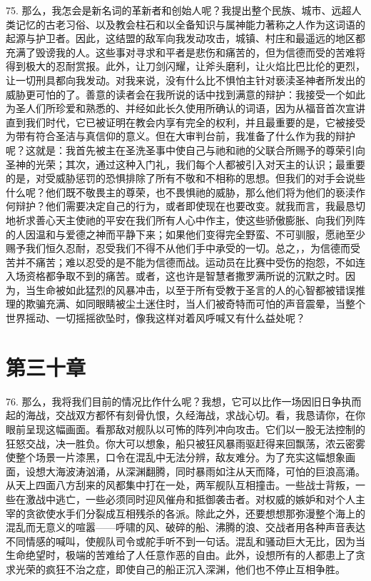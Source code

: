 75. 那么，我怎会是新名词的革新者和创始人呢？我提出整个民族、城市、远超人类记忆的古老习俗、以及教会柱石和以全备知识与属神能力著称之人作为这词语的起源与护卫者。因此，这结盟的敌军向我发动攻击，城镇、村庄和最遥远的地区都充满了毁谤我的人。这些事对寻求和平者是悲伤和痛苦的，但为信德而受的苦难将得到极大的忍耐赏报。此外，让刀剑闪耀，让斧头磨利，让火焰比巴比伦的更烈，让一切刑具都向我发动。对我来说，没有什么比不惧怕主针对亵渎圣神者所发出的威胁更可怕的了。善意的读者会在我所说的话中找到满意的辩护：我接受一个如此为圣人们所珍爱和熟悉的、并经如此长久使用所确认的词语，因为从福音首次宣讲直到我们时代，它已被证明在教会内享有完全的权利，并且最重要的是，它被接受为带有符合圣洁与真信仰的意义。但在大审判台前，我准备了什么作为我的辩护呢？这就是：我首先被主在圣洗圣事中使自己与祂和祂的父联合所赐予的尊荣引向圣神的光荣；其次，通过这种入门礼，我们每个人都被引入对天主的认识；最重要的是，对受威胁惩罚的恐惧排除了所有不敬和不相称的思想。但我们的对手会说些什么呢？他们既不敬畏主的尊荣，也不畏惧祂的威胁，那么他们将为他们的亵渎作何辩护？他们需要决定自己的行为，或者即使现在也要改变。就我而言，我最恳切地祈求善心天主使祂的平安在我们所有人心中作主，使这些骄傲膨胀、向我们列阵的人因温和与爱德之神而平静下来；如果他们变得完全野蛮、不可驯服，愿祂至少赐予我们恒久忍耐，忍受我们不得不从他们手中承受的一切。总之，，为信德而受苦并不痛苦；难以忍受的是不能为信德而战。运动员在比赛中受伤的抱怨，不如连入场资格都争取不到的痛苦。或者，这也许是智慧者撒罗满所说的沉默之时。因为，当生命被如此猛烈的风暴冲击，以至于所有受教于圣言的人的心智都被错误推理的欺骗充满、如同眼睛被尘土迷住时，当人们被奇特而可怕的声音震晕，当整个世界摇动、一切摇摇欲坠时，像我这样对着风呼喊又有什么益处呢？\par


\section{第三十章}

\par

76. 那么，我将我们目前的情况比作什么呢？我想，它可以比作一场因旧日争执而起的海战，交战双方都怀有刻骨仇恨，久经海战，求战心切。看，我恳请你，在你眼前呈现这幅画面。看那敌对舰队以可怖的阵列冲向攻击。它们以一股无法控制的狂怒交战，决一胜负。你大可以想象，船只被狂风暴雨驱赶得来回飘荡，浓云密雾使整个场景一片漆黑，口令在混乱中无法分辨，敌友难分。为了充实这幅想象画面，设想大海波涛汹涌，从深渊翻腾，同时暴雨如注从天而降，可怕的巨浪高涌。从天上四面八方刮来的风都集中打在一处，两军舰队互相撞击。一些战士背叛，一些在激战中逃亡，一些必须同时迎风催舟和抵御袭击者。对权威的嫉妒和对个人主宰的贪欲使水手们分裂成互相残杀的各派。除此之外，还要想想那弥漫整个海上的混乱而无意义的喧嚣——呼啸的风、破碎的船、沸腾的浪、交战者用各种声音表达不同情感的喊叫，使舰队司令或舵手听不到一句话。混乱和骚动巨大无比，因为当生命绝望时，极端的苦难给了人任意作恶的自由。此外，设想所有的人都患上了贪求光荣的疯狂不治之症，即使自己的船正沉入深渊，他们也不停止互相争胜。\par

